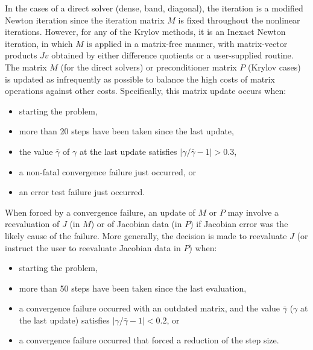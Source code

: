 In the cases of a direct solver (dense, band, diagonal), the
iteration is a modified Newton iteration since the iteration matrix
$M$ is fixed throughout the nonlinear iterations.  However, for any
of the Krylov methods, it is an Inexact Newton iteration, in which $M$
is applied in a matrix-free manner, with matrix-vector products $Jv$
obtained by either difference quotients or a user-supplied routine.
The matrix $M$ (for the direct solvers) or preconditioner matrix $P$
(Krylov cases) is updated as infrequently as possible to balance the
high costs of matrix operations against other costs.  Specifically,
this matrix update occurs when:
\begin{itemize}
\item starting the problem,
\item more than 20 steps have been taken since the last update,
\item the value $\bar{\gamma}$ of $\gamma$ at the last update
satisfies $|\gamma/\bar{\gamma} - 1| > 0.3$,
\item a non-fatal convergence failure just occurred, or
\item an error test failure just occurred.
\end{itemize}
When forced by a convergence failure, an update of $M$ or $P$ may
involve a reevaluation of $J$ (in $M$) or of Jacobian data
(in $P$) if Jacobian error was the likely cause of
the failure.  More generally, the decision is made to reevaluate $J$
(or instruct the user to reevaluate Jacobian data in $P$) when:
\begin{itemize}
\item starting the problem,
\item more than 50 steps have been taken since the last evaluation,
\item a convergence failure occurred with an outdated matrix, and
the value $\bar{\gamma}$ ($\gamma$ at the last update)
satisfies $|\gamma/\bar{\gamma} - 1| < 0.2$, or
\item a convergence failure occurred that forced a reduction of the step size.
\end{itemize}


